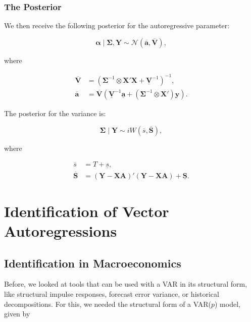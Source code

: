 \subsubsection{The Posterior}

We then receive the following posterior for the autoregressive parameter:

\begin{equation}
	\bm{\alpha}\mid\bm{\Sigma},\bm{Y}\sim \mathcal{N}(\overline{\bm{a}},\overline{\bm{V}}),
\end{equation}

where

\begin{align*}
	\overline{\bm{V}} &= (\bm{\Sigma}^{-1}\otimes \bm{X}'\bm{X}+\underline{\bm{V}}^{-1})^{-1}, \\
	\overline{\bm{a}} &= \overline{\bm{V}}(\underline{\bm{V}}^{-1}\underline{\bm{a}}+(\bm{\Sigma}^{-1}\otimes \bm{X}')\bm{y}).
\end{align*}

The posterior for the variance is:

\begin{equation}
	\bm{\Sigma}\mid\bm{Y}\sim iW(\overline{s},\overline{\bm{S}}),
\end{equation}

where 

\begin{align*}
	\overline{s} &= T + \underline{s}, \\
	\overline{\bm{S}} &= (\bm{Y}- \bm{XA})'(\bm{Y}-\bm{XA}) + \underline{\bm{S}}.
\end{align*}


\section{Identification of Vector Autoregressions}


\subsection{Identification in Macroeconomics}

Before, we looked at tools that can be used with a VAR in its structural form, like structural impulse responses, forecast error variance, or historical decompositions. For this, we needed the structural form of a VAR($p$) model, given by

